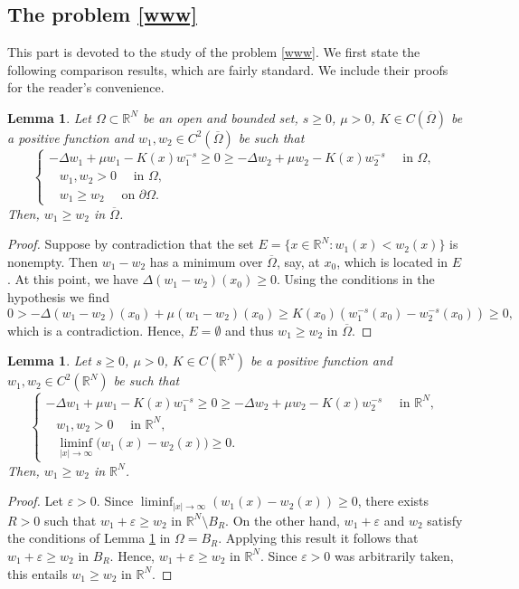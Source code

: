 \documentclass[leqno,12pt]{article}
\newcommand{\ve}{\varepsilon}
\newcommand{\R}{\mathbb R}
\newtheorem{lemma}[theorem]{Lemma}
\numberwithin{equation}{section}
\begin{document}
\subsection{The problem \eqref{www}}

This part is devoted to the study of the problem \eqref{www}. 
We first state the following comparison results, which are fairly standard. We include their proofs for the reader's convenience.
\begin{lemma}\label{comp0}
Let $\Omega\subset \R^N$ be an open and bounded set, $s\geq 0$, $\mu>0$, $K\in C(\overline\Omega)$ be a positive function and $w_1, w_2\in C^2(\overline\Omega)$ be such that 
$$
\begin{cases}
-\Delta w_1+\mu w_1-K(x)w_1^{-s}\geq 0  \geq -\Delta w_2+\mu w_2- K(x)w_2^{-s}\quad\mbox{ in }\Omega,\\[0.2cm]
\;\;\; w_1, w_2>0  \quad\mbox{ in }\Omega,\\[0.2cm]
\;\;\; \displaystyle  w_1\geq w_2 \quad\mbox{ on }\partial\Omega.
\end{cases}
$$
Then, $w_1\geq w_2$ in $\overline\Omega$.
\end{lemma}
\begin{proof}
Suppose by contradiction that the set $E=\{x\in \R^N:w_1(x)<w_2(x)\}$ is nonempty. Then $w_1-w_2$ has a minimum over $\overline\Omega$, say, at $x_0$, which is located in $E$. At this point, we have $\Delta (w_1-w_2)(x_0)\geq 0$. Using the conditions in the hypothesis we find 
$$
0> -\Delta (w_1-w_2)(x_0)+\mu (w_1-w_2) (x_0)\geq K(x_0)(w_1^{-s}(x_0)-w_2^{-s}(x_0))\geq 0,
$$
which is a contradiction. Hence, $E=\emptyset$ and thus $w_1\geq w_2$ in $\overline\Omega$. 
\end{proof}


\begin{lemma}\label{compp}
Let $s\geq 0$, $\mu>0$, $K\in C(\R^N)$ be a positive function and $w_1, w_2\in C^2(\R^N)$ be such that 
$$
\begin{cases}
-\Delta w_1+\mu w_1-K(x)w_1^{-s}\geq 0  \geq -\Delta w_2+\mu w_2- K(x)w_2^{-s}\quad\mbox{ in }\R^N,\\[0.2cm]
\;\;\; w_1, w_2>0  \quad\mbox{ in }\R^N,\\[0.2cm]
\;\;\; \displaystyle  \liminf_{|x|\to \infty} (w_1(x)-w_2(x)\big)\geq  0.
\end{cases}
$$
Then, $w_1\geq w_2$ in $\R^N$.
\end{lemma}
\begin{proof} Let $\varepsilon>0$. Since $\liminf_{|x|\to \infty} (w_1(x)-w_2(x))\geq 0$, there exists $R>0$ such that 
$w_1+\ve\geq w_2$ in $\R^N\setminus B_R$.
On the other hand, $w_1+\ve$ and $w_2$ satisfy the conditions of Lemma \ref{comp0} in $\Omega=B_R$. Applying this result it follows that $w_1+\ve \geq w_2$ in $B_R$. Hence, $w_1+\ve \geq w_2$ in $\R^N$. Since $\ve>0$ was arbitrarily taken, this entails $w_1\geq w_2$ in $\R^N$.
\end{proof}
\end{document}
